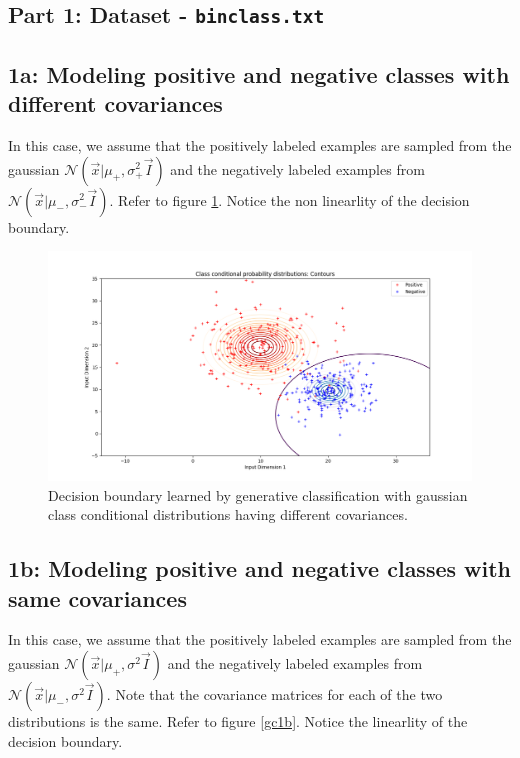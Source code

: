 \documentclass[a4paper,11pt]{article}
\begin{document}
\begin{mlsolution}

\section{Part 1: Dataset - \texttt{binclass.txt}}
\label{dataset1}
\subsection{1a: Modeling positive and negative classes with different covariances}
In this case, we assume that the positively labeled examples are sampled from the gaussian $\mathcal{N}(\vec{x}| \mu_{+}, \sigma^{2}_{+}\vec{I})$ and the negatively labeled examples from $\mathcal{N}(\vec{x}|  \mu_{-}, \sigma^{2}_{-}\vec{I})$. Refer to figure \ref{gc1a}. Notice the non linearlity of the decision boundary.

\begin{figure}[!htb]
	\centering
	\includegraphics[scale=0.4]{generative_binclass.png}
	\caption{Decision boundary learned by generative classification with gaussian class conditional distributions having different covariances.}
	\label{gc1a}
\end{figure}


\subsection{1b: Modeling positive and negative classes with same covariances}
In this case, we assume that the positively labeled examples are sampled from the gaussian $\mathcal{N}(\vec{x}| \mu_{+}, \sigma^{2}\vec{I})$ and the negatively labeled examples from $\mathcal{N}(\vec{x}|  \mu_{-}, \sigma^{2}\vec{I})$. Note that the covariance matrices for each of the two distributions is the same. Refer to figure \ref{gc1b}. Notice the linearlity of the decision boundary.


\end{mlsolution}
\end{document}

